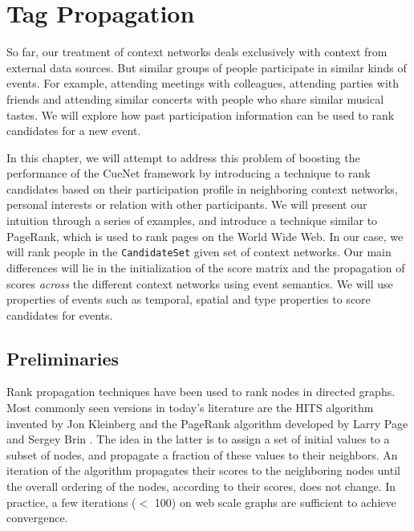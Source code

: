 \chapter{Tag Propagation}

So far, our treatment of context networks deals exclusively with context from external data sources. But similar groups of people participate in similar kinds of events. For example, attending meetings with colleagues, attending parties with friends and attending similar concerts with people who share similar musical tastes. We will explore how past participation information can be used to rank candidates for a new event.

In this chapter, we will attempt to address this problem of boosting the performance of the CueNet framework by introducing a technique to rank candidates based on their participation profile in neighboring context networks, personal interests or relation with other participants. We will present our intuition through a series of examples, and introduce a technique similar to PageRank, which is used to rank pages on the World Wide Web. In our case, we will rank people in the \texttt{CandidateSet} given set of context networks. Our main differences will lie in the initialization of the score matrix and the propagation of scores \textit{across} the different context networks using event semantics. We will use properties of events such as temporal, spatial and type properties to score candidates for events.

\section{Preliminaries}

Rank propagation techniques have been used to rank nodes in directed graphs. Most commonly seen versions in today's literature are the HITS algorithm invented by Jon Kleinberg \cite{kleinberg1999authoritative} and the PageRank algorithm developed by Larry Page and Sergey Brin \cite{page1999pagerank}. The idea in the latter is to assign a set of initial values to a subset of nodes, and propagate a fraction of these values to their neighbors. An iteration of the algorithm propagates their scores to the neighboring nodes until the overall ordering of the nodes, according to their scores, does not change. In practice, a few iterations ($<$ 100) on web scale graphs are sufficient to achieve convergence.

